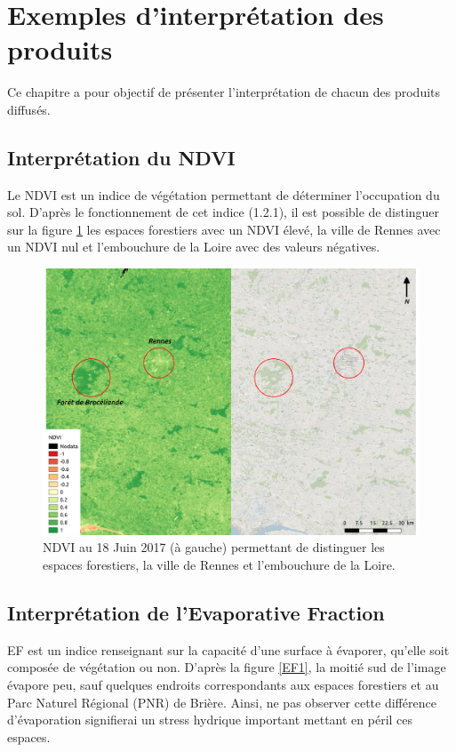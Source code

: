 \documentclass[10pt,a4paper]{article}
\begin{document}
\section{Exemples d'interprétation des produits}

Ce chapitre a pour objectif de présenter l'interprétation de chacun des produits diffusés.

\subsection{Interprétation du NDVI}

Le NDVI est un indice de végétation permettant de déterminer l'occupation du sol. D'après le fonctionnement de cet indice (1.2.1), il est possible de distinguer sur la figure \ref{NDVI1} les espaces forestiers avec un NDVI élevé, la ville de Rennes avec un NDVI nul et l'embouchure de la Loire avec des valeurs négatives.

\begin{figure}[!h]
\centering
\includegraphics[scale=0.33]{img/NDVI_interpretation1.pdf}
\caption{NDVI au 18 Juin 2017 (à gauche) permettant de distinguer les espaces forestiers, la ville de Rennes et l'embouchure de la Loire.}
\label{NDVI1}
\end{figure}

\subsection{Interprétation de l'Evaporative Fraction}

EF est un indice renseignant sur la capacité d'une
surface à évaporer, qu’elle soit composée de végétation ou non. D'après la figure \ref{EF1}, la moitié sud de l'image évapore peu, sauf quelques endroits correspondants aux espaces forestiers et au Parc Naturel Régional (PNR) de Brière. Ainsi, ne pas observer cette différence d'évaporation signifierai un stress hydrique important mettant en péril ces espaces.
\end{document}
